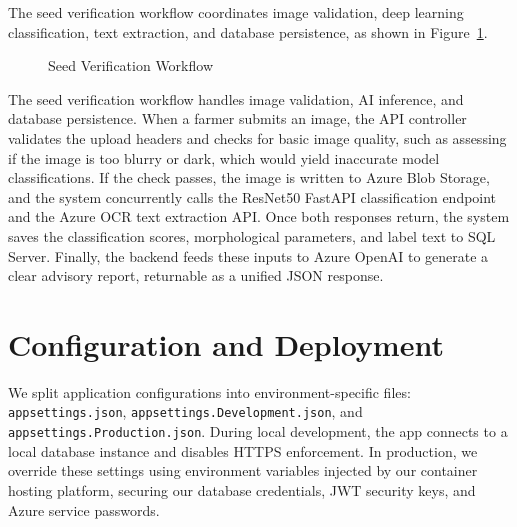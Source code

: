 The seed verification workflow coordinates image validation, deep learning classification, text extraction, and database persistence, as shown in Figure~\ref{fig:verification-workflow}.

\begin{figure}[H]
\centering
{}
\caption{Seed Verification Workflow}
\label{fig:verification-workflow}
\end{figure}

The seed verification workflow handles image validation, AI inference, and database persistence. When a farmer submits an image, the API controller validates the upload headers and checks for basic image quality, such as assessing if the image is too blurry or dark, which would yield inaccurate model classifications. If the check passes, the image is written to Azure Blob Storage, and the system concurrently calls the ResNet50 FastAPI classification endpoint and the Azure OCR text extraction API. Once both responses return, the system saves the classification scores, morphological parameters, and label text to SQL Server. Finally, the backend feeds these inputs to Azure OpenAI to generate a clear advisory report, returnable as a unified JSON response.

\section{Configuration and Deployment}
\label{sec:configuration-deployment}

We split application configurations into environment-specific files: \texttt{appsettings.json}, \texttt{appsettings.Development.json}, and \texttt{appsettings.Production.json}. During local development, the app connects to a local database instance and disables HTTPS enforcement. In production, we override these settings using environment variables injected by our container hosting platform, securing our database credentials, JWT security keys, and Azure service passwords.

